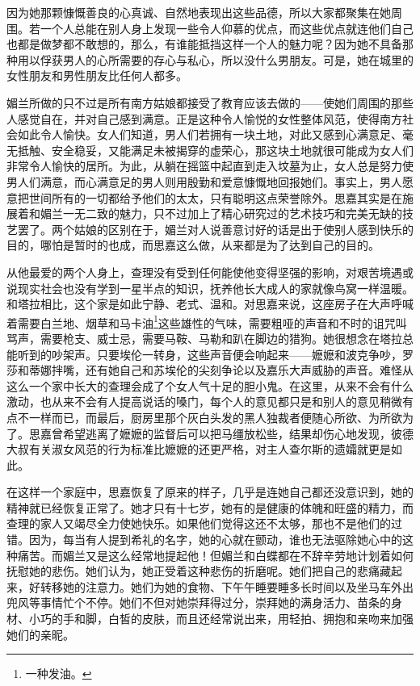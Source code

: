 \par 因为她那颗慷慨善良的心真诚、自然地表现出这些品德，所以大家都聚集在她周围。若一个人总能在别人身上发现一些令人仰慕的优点，而这些优点就连他们自己也都是做梦都不敢想的，那么，有谁能抵挡这样一个人的魅力呢？因为她不具备那种用以俘获男人的心所需要的存心与私心，所以没什么男朋友。可是，她在城里的女性朋友和男性朋友比任何人都多。
\par 媚兰所做的只不过是所有南方姑娘都接受了教育应该去做的——使她们周围的那些人感觉自在，并对自己感到满意。正是这种令人愉悦的女性整体风范，使得南方社会如此令人愉快。女人们知道，男人们若拥有一块土地，对此又感到心满意足、毫无抵触、安全稳妥，又能满足未被揭穿的虚荣心，那这块土地就很可能成为女人们非常令人愉快的居所。为此，从躺在摇篮中起直到走入坟墓为止，女人总是努力使男人们满意，而心满意足的男人则用殷勤和爱意慷慨地回报她们。事实上，男人愿意把世间所有的一切都给予他们的太太，只有聪明这点荣誉除外。思嘉其实是在施展着和媚兰一无二致的魅力，只不过加上了精心研究过的艺术技巧和完美无缺的技艺罢了。两个姑娘的区别在于，媚兰对人说善意讨好的话是出于使别人感到快乐的目的，哪怕是暂时的也成，而思嘉这么做，从来都是为了达到自己的目的。
\par 从他最爱的两个人身上，查理没有受到任何能使他变得坚强的影响，对艰苦境遇或说现实社会也没有学到一星半点的知识，抚养他长大成人的家就像鸟窝一样温暖。和塔拉相比，这个家是如此宁静、老式、温和。对思嘉来说，这座房子在大声呼喊着需要白兰地、烟草和马卡油\footnote{一种发油。}这些雄性的气味，需要粗哑的声音和不时的诅咒叫骂声，需要枪支、威士忌，需要马鞍、马勒和趴在脚边的猎狗。她很想念在塔拉总能听到的吵架声。只要埃伦一转身，这些声音便会响起来——嬷嬷和波克争吵，罗莎和蒂娜拌嘴，还有她自己和苏埃伦的尖刻争论以及嘉乐大声威胁的声音。难怪从这么一个家中长大的查理会成了个女人气十足的胆小鬼。在这里，从来不会有什么激动，也从来不会有人提高说话的嗓门，每个人的意见都只是和别人的意见稍微有点不一样而已，而最后，厨房里那个灰白头发的黑人独裁者便随心所欲、为所欲为了。思嘉曾希望逃离了嬷嬷的监督后可以把马缰放松些，结果却伤心地发现，彼德大叔有关淑女风范的行为标准比嬷嬷的还更严格，对主人查尔斯的遗孀就更是如此。
\par 在这样一个家庭中，思嘉恢复了原来的样子，几乎是连她自己都还没意识到，她的精神就已经恢复正常了。她才只有十七岁，她有的是健康的体魄和旺盛的精力，而查理的家人又竭尽全力使她快乐。如果他们觉得这还不太够，那也不是他们的过错。因为，每当有人提到希礼的名字，她的心就在颤动，谁也无法驱除她心中的这种痛苦。而媚兰又是这么经常地提起他！但媚兰和白蝶都在不辞辛劳地计划着如何抚慰她的悲伤。她们认为，她正受着这种悲伤的折磨呢。她们把自己的悲痛藏起来，好转移她的注意力。她们为她的食物、下午午睡要睡多长时间以及坐马车外出兜风等事情忙个不停。她们不但对她崇拜得过分，崇拜她的满身活力、苗条的身材、小巧的手和脚，白皙的皮肤，而且还经常说出来，用轻拍、拥抱和亲吻来加强她们的亲昵。
